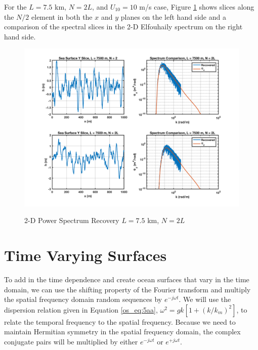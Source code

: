 For the $L = 7.5$ km, $N = 2L$, and $U_{10} = 10$ m/s case, Figure \ref{os_fig:12a} shows slices along the $N/2$ element in both the $x$ and $y$ planes on the left hand side and a comparison of the spectral slices in the 2-D Elfouhaily spectrum on the right hand side.
\begin{figure}[H]
  \begin{center}
\includegraphics[width=6in]{../media/Ocean_Surface/sea_surface_2d_slices_7500.png}
  \end{center}
  \renewcommand{\baselinestretch}{1} \small\normalsize
  \begin{quote}
    \caption[2-D Power Spectrum Recovery $L = 7.5$ km, $N = 2L$]{2-D Power Spectrum Recovery $L = 7.5$ km, $N = 2L$\label{os_fig:12a}}
  \end{quote}
\end{figure}
\renewcommand{\baselinestretch}{2} \small\normalsize

\section{Time Varying Surfaces}
To add in the time dependence and create ocean surfaces that vary in the time domain, we can use the shifting property of the Fourier transform and multiply the spatial frequency domain random sequences by $e^{-j\omega t}$. We will use the dispersion relation given in Equation \ref{os_eq:5aa}, $\omega^2 = gk\left[1 +(k/k_m)^2 \right]$, to relate the temporal frequency to the spatial frequency. Because we need to maintain Hermitian symmetry in the spatial frequency domain, the complex conjugate pairs will be multiplied by either $e^{-j\omega t}$ or $e^{+j\omega t}$.

